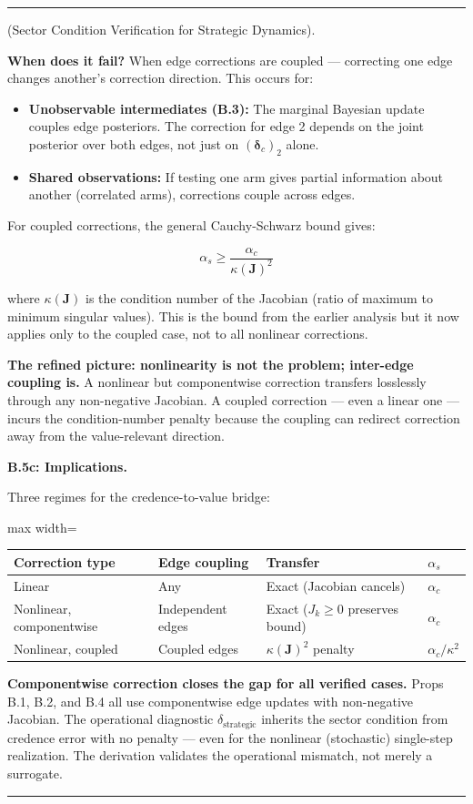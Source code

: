 \documentclass[11pt,oneside]{article}
\newcounter{claim}[section]
\renewcommand{\theclaim}{\thesection.\arabic{claim}}
\newenvironment{segment}[2]{%
  \refstepcounter{claim}%
  \bigskip\noindent\hrule\smallskip
  \noindent{\bfseries #1~\theclaim}\enskip(#2).\par\smallskip
  \noindent\ignorespaces
}{%
  \par\smallskip\noindent\hrule\bigskip
}
\newenvironment{derivation}[1][]{\begin{segment}{Derivation}{#1}}{\end{segment}}
\begin{document}
\begin{derivation}[Sector Condition Verification for Strategic Dynamics]
\textbf{When does it fail?} When edge corrections are coupled — correcting one edge changes another's correction direction. This occurs for:
\begin{itemize}
  \item \textbf{Unobservable intermediates (B.3):} The marginal Bayesian update couples edge posteriors. The correction for edge 2 depends on the joint posterior over both edges, not just on $(\boldsymbol\delta_c)_2$ alone.
  \item \textbf{Shared observations:} If testing one arm gives partial information about another (correlated arms), corrections couple across edges.
\end{itemize}


For coupled corrections, the general Cauchy-Schwarz bound gives:

$$\alpha_s \geq \frac{\alpha_c}{\kappa(\mathbf{J})^2}$$

where $\kappa(\mathbf{J})$ is the condition number of the Jacobian (ratio of maximum to minimum singular values). This is the bound from the earlier analysis but it now applies only to the coupled case, not to all nonlinear corrections.

\textbf{The refined picture: nonlinearity is not the problem; inter-edge coupling is.} A nonlinear but componentwise correction transfers losslessly through any non-negative Jacobian. A coupled correction — even a linear one — incurs the condition-number penalty because the coupling can redirect correction away from the value-relevant direction.


\medskip\noindent\textbf{B.5c: Implications.}


Three regimes for the credence-to-value bridge:

\begin{adjustbox}{max width=\textwidth}
\small
\begin{tabular}{llll}
\toprule
Correction type & Edge coupling & Transfer & $\alpha_s$ \\
\midrule
Linear & Any & Exact (Jacobian cancels) & $\alpha_c$ \\
Nonlinear, componentwise & Independent edges & Exact ($J_k \geq 0$ preserves bound) & $\alpha_c$ \\
Nonlinear, coupled & Coupled edges & $\kappa(\mathbf{J})^2$ penalty & $\alpha_c / \kappa^2$ \\
\bottomrule
\end{tabular}
\end{adjustbox}


\textbf{Componentwise correction closes the gap for all verified cases.} Props B.1, B.2, and B.4 all use componentwise edge updates with non-negative Jacobian. The operational diagnostic $\delta_{\text{strategic}}$ inherits the sector condition from credence error with no penalty — even for the nonlinear (stochastic) single-step realization. The derivation validates the operational mismatch, not merely a surrogate.


\end{derivation}
\end{document}
